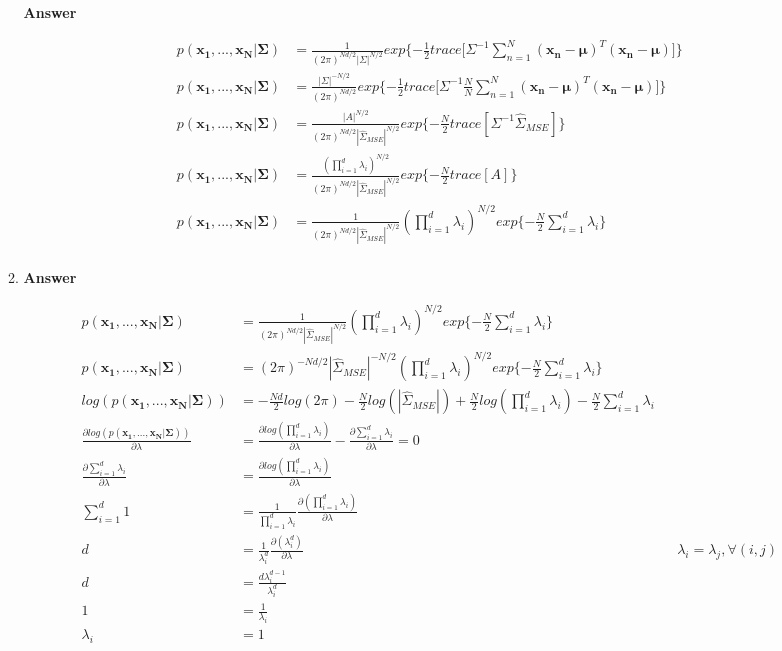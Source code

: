 \documentclass[11pt]{article}
\begin{document}
\begin{enumerate}[label=(\alph*)]
\begin{enumerate}[label=(\roman*)]
\noindent\textbf{Answer}

\begin{align*}
p(\mathbf{x_1,...,x_N|\Sigma}) &= \frac{1}{(2\pi)^{Nd/2}|\Sigma|^{N/2}}exp{\{-\frac{1}{2}}trace[\Sigma^{-1}\sum_{n=1}^N{{(\mathbf{x_n-\mu})^T(\mathbf{x_n-\mu})}]\}}\\
p(\mathbf{x_1,...,x_N|\Sigma}) &= \frac{|\Sigma|^{-N/2}}{(2\pi)^{Nd/2}}exp{\{-\frac{1}{2}}trace[\Sigma^{-1}\frac{N}{N}\sum_{n=1}^N{{(\mathbf{x_n-\mu})^T(\mathbf{x_n-\mu})}]\}}\\
p(\mathbf{x_1,...,x_N|\Sigma}) &= \frac{|A|^{N/2}}{(2\pi)^{Nd/2}|\hat{\Sigma}_{MSE}|^{N/2}}exp{\{-\frac{N}{2}trace[\Sigma^{-1}\hat{\Sigma}_{MSE}]\}}\\
p(\mathbf{x_1,...,x_N|\Sigma}) &= \frac{(\prod_{i=1}^d{\lambda_i})^{N/2}}{(2\pi)^{Nd/2}|\hat{\Sigma}_{MSE}|^{N/2}}exp{\{-\frac{N}{2}trace[A]\}}\\
p(\mathbf{x_1,...,x_N|\Sigma}) &= \frac{1}{(2\pi)^{Nd/2}|\hat{\Sigma}_{MSE}|^{N/2}}(\prod_{i=1}^d{\lambda_i})^{N/2}exp{\{-\frac{N}{2}\sum_{i=1}^d{\lambda_i}\}}\\
\end{align*}

\item 

\noindent\textbf{Answer}

\begin{align*}
p(\mathbf{x_1,...,x_N|\Sigma}) &= \frac{1}{(2\pi)^{Nd/2}|\hat{\Sigma}_{MSE}|^{N/2}}(\prod_{i=1}^d{\lambda_i})^{N/2}exp{\{-\frac{N}{2}\sum_{i=1}^d{\lambda_i}\}}\\
p(\mathbf{x_1,...,x_N|\Sigma}) &= (2\pi)^{-Nd/2}|\hat{\Sigma}_{MSE}|^{-N/2}(\prod_{i=1}^d{\lambda_i})^{N/2}exp{\{-\frac{N}{2}\sum_{i=1}^d{\lambda_i}\}}\\
log(p(\mathbf{x_1,...,x_N|\Sigma})) &= -\frac{Nd}{2}log(2\pi) - \frac{N}{2}log(|\hat{\Sigma}_{MSE}|) + \frac{N}{2}log(\prod_{i=1}^d{\lambda_i}) -\frac{N}{2}\sum_{i=1}^d{\lambda_i} \\ 
\frac{\partial{log(p(\mathbf{x_1,...,x_N|\Sigma}))}}{\partial{\lambda}} &=\frac{\partial{log(\prod_{i=1}^d{\lambda_i})}}{\partial{\lambda}}- \frac{\partial{\sum_{i=1}^d{\lambda_i}}}{\partial{\lambda}} = 0 \\
\frac{\partial{\sum_{i=1}^d{\lambda_i}}}{\partial{\lambda}} &=\frac{\partial{log(\prod_{i=1}^d{\lambda_i})}}{\partial{\lambda}} \\
\sum_{i=1}^d{1} &=\frac{1}{\prod_{i=1}^d{\lambda_i}}\frac{\partial{(\prod_{i=1}^d{\lambda_i})}}{\partial{\lambda}} \\
d &=\frac{1}{\lambda_i^d}\frac{\partial{(\lambda_i^d)}}{\partial{\lambda}} && \lambda_ i =\lambda_ j ,\forall(i,j) \\
d &=\frac{d\lambda_i^{d-1}}{\lambda_i^d} \\
1 &=\frac{1}{\lambda_i} \\
\lambda_i &=1 \\
\end{align*}


\end{enumerate}
\end{enumerate}
\end{document}
